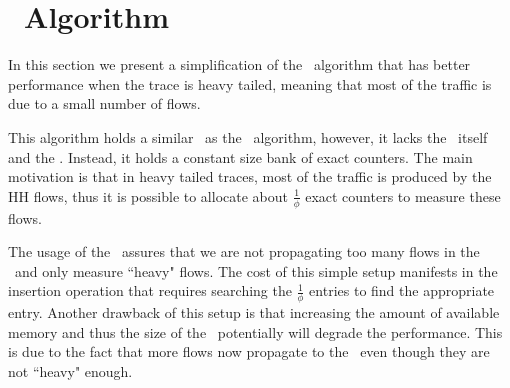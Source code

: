 \section{\eb\ Algorithm}
\label{sec:improvemnts}
In this section we present a simplification of the \cs\ algorithm that has better performance when the trace is heavy tailed, meaning that most of the traffic is due to a small number of flows.

This algorithm holds a similar \sfa\ as the \cs\ algorithm, however, it lacks the \cs\ itself and the \sea. Instead, it holds a constant size bank of exact counters. The main motivation is that in heavy tailed traces, most of the traffic is produced by the HH flows, thus it is possible to allocate about $\frac{1}{\phi}$ exact counters to measure these flows.

The usage of the \sfa\ assures that we are not propagating too many flows in the \eb\ and only measure ``heavy" flows. The cost of this simple setup manifests in the insertion operation that requires searching the $\frac{1}{\phi}$ entries to find the appropriate entry. Another drawback of this setup is that increasing the amount of available memory and thus the size of the \sfa\ potentially will degrade the performance. This is due to the fact that more flows now propagate to the \eb\ even though they are not ``heavy" enough.

